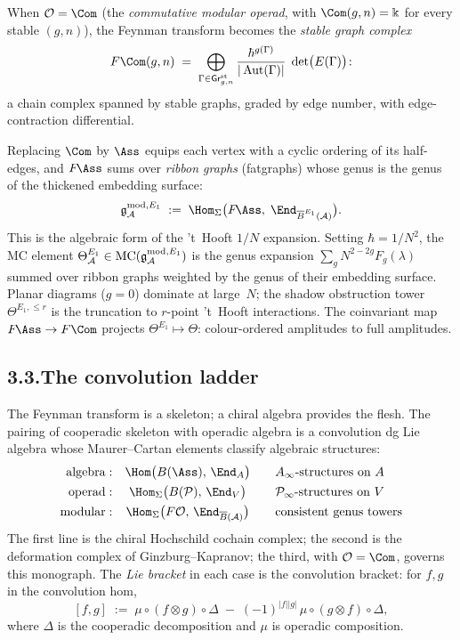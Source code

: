When $\cO=\Com$ (the \emph{commutative modular operad}, with
$\Com(g,n)=\Bbbk$ for every stable $(g,n)$), the Feynman transform
becomes the \emph{stable graph complex}
\begin{equation}\label{eq:preface-fcom}
F\Com(g,n)
\;=\;
\bigoplus_{\Gamma\in\mathsf{Gr}^{\mathrm{st}}_{g,n}}
\frac{\hbar^{g(\Gamma)}}{|\operatorname{Aut}(\Gamma)|}
\;\det\bigl(E(\Gamma)\bigr)\!:
\end{equation}
a chain complex spanned by stable graphs, graded by edge number,
with edge-contraction differential.

Replacing $\Com$ by $\Ass$ equips each vertex with a cyclic
ordering of its half-edges, and $F\!\Ass$ sums over
\emph{ribbon graphs} (fatgraphs) whose genus is the genus of
the thickened embedding surface:
\[
\mathfrak{g}^{\mathrm{mod},\Eone}_\cA
\;:=\;
\Hom_\Sigma\bigl(F\!\Ass,\;
\End_{\barB^{\Eone}(\cA)}\bigr).
\]
This is the algebraic form of the 't~Hooft $1/N$ expansion.
Setting $\hbar = 1/N^2$, the MC element
$\Theta^{E_1}_{\mathcal{A}} \in \operatorname{MC}
(\mathfrak{g}^{\mathrm{mod},E_1}_{\mathcal{A}})$
is the genus expansion
$\sum_g N^{2-2g}F_g(\lambda)$ summed over ribbon graphs weighted
by the genus of their embedding surface.
Planar diagrams ($g=0$) dominate at large~$N$; the shadow
obstruction tower $\Theta^{E_1,\le r}$ is the truncation to
$r$-point 't~Hooft interactions.
The coinvariant map $F\!\Ass \to F\Com$ projects
$\Theta^{E_1} \mapsto \Theta$:
colour-ordered amplitudes to full amplitudes.

\subsection*{3.3.\enspace The convolution ladder}

The Feynman transform is a skeleton; a chiral algebra provides
the flesh. The pairing of cooperadic skeleton with operadic
algebra is a convolution dg Lie algebra whose Maurer--Cartan
elements classify algebraic structures:
\begin{equation}\label{eq:preface-convolution-ladder}
\begin{array}{r@{\;:\quad}c@{\qquad}l}
\text{algebra} &
 \Hom\bigl(B(\Ass),\,\End_A\bigr)
 & A_\infty\text{-structures on }A \\[4pt]
\text{operad} &
 \Hom_\Sigma\bigl(B(\cP),\,\End_V\bigr)
 & \cP_\infty\text{-structures on }V \\[4pt]
\text{modular} &
 \Hom_\Sigma\bigl(F\cO,\,\End_{\barB(\cA)}\bigr)
 & \text{consistent genus towers}
\end{array}
\end{equation}
The first line is the chiral Hochschild cochain complex; the
second is the deformation complex of Ginzburg--Kapranov;
the third, with $\cO=\Com$, governs this monograph. The
\emph{Lie bracket} in each case is the convolution bracket:
for $f, g$ in the convolution hom,
\[
[f, g]
\;:=\;
\mu \circ (f \otimes g) \circ \Delta
\;-\;
(-1)^{|f||g|}\,
\mu \circ (g \otimes f) \circ \Delta,
\]
where $\Delta$ is the cooperadic decomposition and $\mu$ is
operadic composition.

